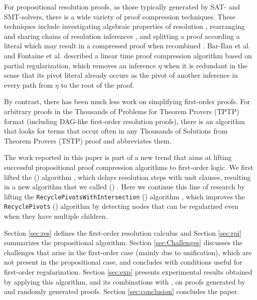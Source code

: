For propositional resolution proofs, as those typically generated by SAT- and SMT-solvers, there is a wide variety of proof compression techniques. 
These techniques include investigating algebraic properties of resolution \cite{bwp10}, rearranging and sharing chains of resolution inferences \cite{Amjad07, Sinz}, and splitting a proof according a literal which may result in a compressed proof when recombined \cite{CottonSplit}.
Bar-Ilan et al. \cite{RP08} and Fontaine et al. \cite{LURPI} described a linear time proof compression algorithm based on partial
regularization, which removes an inference $\eta$ when it is redundant in the sense that its pivot literal already occurs as the pivot of another inference in every path from $\eta$ to the root of the proof.


By contrast, there has been much less work on simplifying first-order proofs. 
For arbitrary proofs in the Thousands of Problems for Theorem Provers (TPTP) \cite{TPTP} format (including DAG-like first-order resolution proofs), there is an algorithm \cite{LPARCzech} that looks for terms that occur often in any Thousands of Solutions from Theorem Provers (TSTP) \cite{TPTP} proof and abbreviates them. 


The work reported in this paper is part of a new trend that aims at lifting successful propositional proof compression algorithms to first-order logic. %
We first lifted the {\LowerUnits} ({\LU}) algorithm \cite{LURPI}, which delays resolution steps with unit clauses, resulting in a new algorithm that we called
{\SFOLowerUnits} 
({\GFOLU}) \cite{GFOLU}. Here we continue this line of research by lifting the 
\texttt{Recycle\-PivotsWithIntersection}
({\RPI}) algorithm \cite{LURPI}, which improves the \texttt{RecyclePivots} ({\RP}) algorithm \cite{RP08} by detecting nodes that can be regularized even when they have multiple children. 


Section \ref{sec:res} defines the first-order resolution calculus and Section \ref{sec:rpi} summarizes the propositional {\RPI} algorithm. Section \ref{sec:Challenges} discusses the challenges that arise in the first-order case (mainly due to unification), which are not present in the propositional case, and concludes with conditions useful for first-order regularization. Section \ref{sec:exp} presents experimental results obtained by applying this algorithm, and its combinations with {\GFOLU}, on proofs generated by {\SPASS} and randomly generated proofs. Section \ref{sec:conclusion} concludes the paper.

